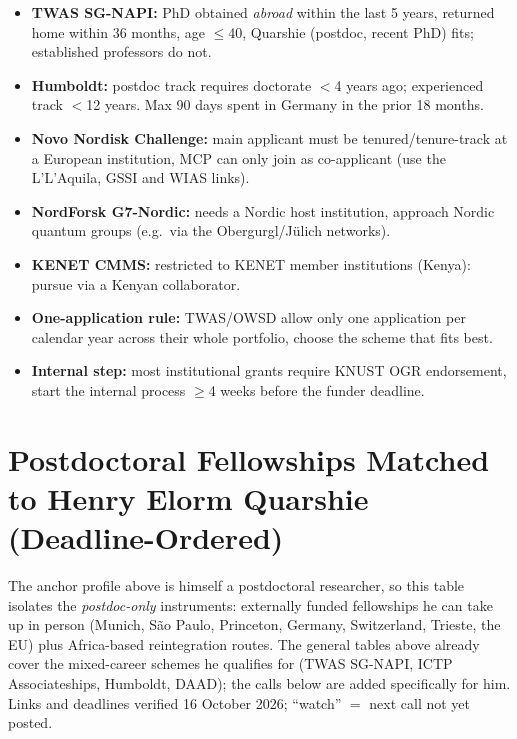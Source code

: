 \documentclass[11pt,a4paper]{article}
\begin{document}
\begin{itemize}[leftmargin=1.4em]
  \item \textbf{TWAS SG-NAPI:} PhD obtained \emph{abroad} within the last 5 years, returned home within 36 months, age $\leq$40, Quarshie (postdoc, recent PhD) fits; established professors do not.
  \item \textbf{Humboldt:} postdoc track requires doctorate $<$4 years ago; experienced track $<$12 years. Max 90 days spent in Germany in the prior 18 months.
  \item \textbf{Novo Nordisk Challenge:} main applicant must be tenured/tenure-track at a European institution, MCP can only join as co-applicant (use the L'L’Aquila, GSSI and WIAS links).
  \item \textbf{NordForsk G7-Nordic:} needs a Nordic host institution, approach Nordic quantum groups (e.g.\ via the Obergurgl/Jülich networks).
  \item \textbf{KENET CMMS:} restricted to KENET member institutions (Kenya): pursue via a Kenyan collaborator.
  \item \textbf{One-application rule:} TWAS/OWSD allow only one application per calendar year across their whole portfolio, choose the scheme that fits best.
  \item \textbf{Internal step:} most institutional grants require KNUST OGR endorsement, start the internal process $\geq$4 weeks before the funder deadline.
\end{itemize}

\section{Postdoctoral Fellowships Matched to Henry Elorm Quarshie (Deadline-Ordered)}

\noindent The anchor profile above is himself a postdoctoral researcher, so this table isolates the \emph{postdoc-only} instruments: externally funded fellowships he can take up in person (Munich, S\~ao Paulo, Princeton, Germany, Switzerland, Trieste, the EU) plus Africa-based reintegration routes. The general tables above already cover the mixed-career schemes he qualifies for (TWAS SG-NAPI, ICTP Associateships, Humboldt, DAAD); the calls below are added specifically for him. Links and deadlines verified 16 October 2026; ``watch'' $=$ next call not yet posted.
\end{document}
